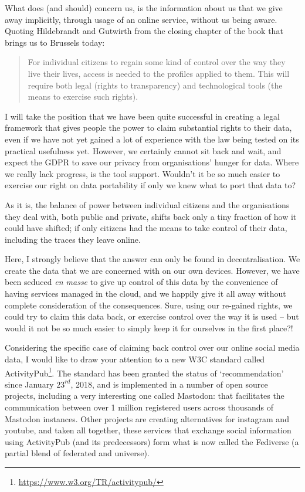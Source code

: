 \documentclass[a4paper,twoside,12pt]{article}
\begin{document}
What does (and should) concern us, is the information about us that we give away implicitly, through usage of an online service, without us being aware. Quoting Hildebrandt and Gutwirth from the closing chapter of the book that brings us to Brussels today:
\begin{quote}
For individual citizens to regain some kind of control over the way they live their lives, access is
needed to the profiles applied to them. This will require both legal (rights to transparency)
and technological tools (the means to exercise such rights).
\end{quote}

I will take the position that we have been quite successful in creating a legal framework that gives people the power to claim substantial rights to their data, even if we have not yet gained a lot of experience with the law being tested on its practical usefulness yet. However, we certainly cannot sit back and wait, and expect the GDPR to save our privacy from organisations' hunger for data. Where we really lack progress, is the tool support. Wouldn't it be so much easier to exercise our right on data portability if only we knew what to port that data to? 

As it is, the balance of power between individual citizens and the organisations they deal with, both public and private, shifts back only a tiny fraction of how it could have shifted; if only citizens had the means to take control of their data, including the traces they leave online.

Here, I strongly believe that the answer can only be found in decentralisation. We create the data that we are concerned with on our own devices. However, we have been seduced \emph{en masse} to give up control of this data by the convenience of having services managed in the cloud, and we happily give it all away without complete consideration of the consequences. Sure, using our re-gained rights, we could try to claim this data back, or exercise control over the way it is used -- but would it not be so much easier to simply keep it for ourselves in the first place?!

Considering the specific case of claiming back control over our online social media data, I would like to draw your attention to a new W3C standard called ActivityPub\footnote{%
\url{https://www.w3.org/TR/activitypub/}}.
The standard has been granted the status of `recommendation' since January $23^\textit{rd}$, 2018, and is implemented in a number of open source projects, including a very interesting one called Mastodon: that facilitates the communication between over 1 million registered users across thousands of Mastodon instances. Other projects are creating alternatives for instagram and youtube, and taken all together, these services that exchange social information using ActivityPub (and its predecessors) form what is now called the Fediverse (a partial blend of federated and universe).
\end{document}
